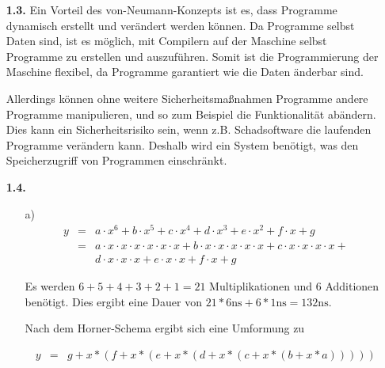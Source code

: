 \documentclass[10pt,a4paper]{article}
\begin{document}
\begin{enumerate}
    \item[\textbf{1.3.}]
        Ein Vorteil des von-Neumann-Konzepts ist es, dass Programme dynamisch erstellt und verändert werden 
        können. Da Programme selbst Daten sind, ist es möglich, mit Compilern auf der Maschine selbst Programme
        zu erstellen und auszuführen. Somit ist die Programmierung der Maschine flexibel, da Programme garantiert
        wie die Daten änderbar sind.
        
        Allerdings können ohne weitere Sicherheitsmaßnahmen Programme andere Programme manipulieren, und so zum Beispiel
        die Funktionalität abändern. Dies kann ein Sicherheitsrisiko sein, wenn z.B. Schadsoftware die laufenden Programme
        verändern kann. Deshalb wird ein System benötigt, was den Speicherzugriff von Programmen einschränkt.
        
    \item[\textbf{1.4.}]
        \begin{enumerate}
            \item[a)]
                $$\begin{array}{rcl}
                    y &=& a \cdot x^6 + b \cdot x^5 + c \cdot x^4 + d \cdot x^3 + e \cdot x^2 + f \cdot x + g\\
                      &=& a \cdot x \cdot x \cdot x \cdot x \cdot x \cdot x + b \cdot x \cdot x \cdot x \cdot x \cdot x + c \cdot x \cdot x \cdot x \cdot x + \\
                       && d \cdot x \cdot x \cdot x + e \cdot x \cdot x + f \cdot x + g
                \end{array}$$
                
                Es werden $6 + 5 + 4 + 3 + 2 + 1 = 21$ Multiplikationen und $6$ Additionen benötigt. Dies ergibt
                eine Dauer von $21 * 6 \text{ns} + 6 * 1 \text{ns} = 132 \text{ns}$.
                
                Nach dem Horner-Schema ergibt sich eine Umformung zu
                
                $$\begin{array}{rcl}
                    y &=& g + x * (f + x * (e + x * (d + x * (c + x * (b + x * a)))))
                \end{array}$$
                

\end{enumerate}
\end{enumerate}
\end{document}

